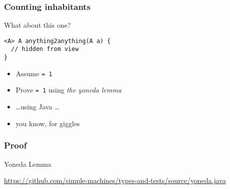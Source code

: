 \begin{frame}[fragile]
\frametitle{Counting inhabitants}
\begin{block}{What about this one?}
\begin{lstlisting}[style=java]
<A> A anything2anything(A a) {
  // hidden from view 
}
\end{lstlisting}
\end{block}
\begin{center}
\begin{itemize}
\item<1-> Assume \lstinline{= 1}
\item<1-> Prove \lstinline{= 1} using \emph{the yoneda lemma}
\item<2-> \ldots using Java \ldots
\item<2-> you know, for giggles
\end{itemize}
\end{center}
\end{frame}

\begin{frame}[fragile]
\frametitle{Proof}
\begin{block}{Yoneda Lemma}
\begin{center}
\href{https://github.com/simple-machines/types-and-tests/source/yoneda.java}{https://github.com/simple-machines/types-and-tests/source/yoneda.java}
\end{center}
\end{block}
\end{frame}

